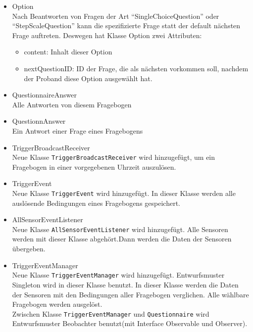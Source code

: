 \documentclass[a4paper]{scrreprt}
\begin{document}
                   \begin{itemize}
                       \item Option \\ Nach Beantworten von Fragen der Art ``SingleChoiceQuestion'' oder ``StepScaleQuestion'' kann die spezifizierte Frage statt der default nächsten Frage auftreten. Deswegen hat Klasse Option zwei Attributen:
                                \begin{itemize}
                                    \item content: Inhalt dieser Option
                                    \item nextQuestionID: ID der Frage, die als nächsten vorkommen soll, nachdem der Proband diese Option ausgewählt hat.
                                \end{itemize}
                            \item QuestionnaireAnswer \\ Alle Antworten von diesem Fragebogen
                            \item QuestionnAnswer \\ Ein Antwort einer Frage eines Fragebogens
                       \item TriggerBroadcastReceiver \\ Neue Klasse \texttt{TriggerBroadcastReceiver} wird hinzugefügt, um ein Fragebogen in einer vorgegebenen Uhrzeit auszulösen.
                       \item TriggerEvent\\ Neue Klasse \texttt{TriggerEvent} wird hinzugefügt. In dieser Klasse werden alle auslösende Bedingungen eines Fragebogens gespeichert.
                       \item AllSensorEventListener\\ Neue Klasse \texttt{AllSensorEventListener} wird hinzugefügt. Alle Sensoren werden mit dieser Klasse abgehört.Dann werden die Daten der Sensoren übergeben.
                       \item TriggerEventManager \\ 
                       Neue Klasse \texttt{TriggerEventManager} wird hinzugefügt. Entwurfsmuster Singleton wird in dieser Klasse benutzt. In dieser Klasse werden die Daten der Sensoren mit den Bedingungen aller Fragebogen verglichen. Alle wählbare Fragebogen werden ausgelöst.\\
                       Zwischen Klasse \texttt{TriggerEventManager} und \texttt{Questionnaire} wird Entwurfsmuster Beobachter benutzt(mit Interface Observable und Observer).
                   \end{itemize}
\end{document}
